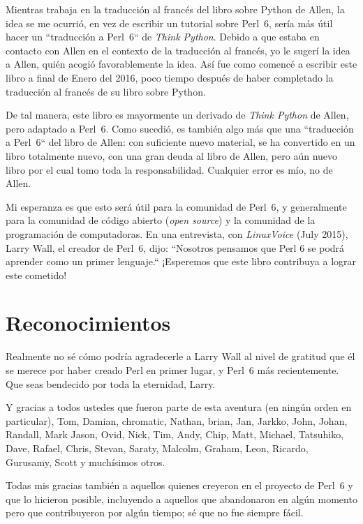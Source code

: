 Mientras trabaja en la traducción al francés del libro sobre Python
de Allen, la idea se me ocurrió, en vez de escribir un tutorial
sobre Perl~6, sería más útil hacer un ``traducción a Perl~6`` de 
\emph{Think Python}. Debido a que estaba en contacto con Allen en 
el contexto de la traducción al francés, yo le sugerí la idea a Allen, 
quién acogió favorablemente la idea. Así fue como comencé a escribir este 
libro a final de Enero del 2016, poco tiempo después de haber completado
la traducción al francés de su libro sobre Python.

De tal manera, este libro es mayormente un derivado de \emph{Think Python}
de Allen, pero adaptado a Perl~6. Como sucedió, es también algo más que 
una ``traducción a Perl~6`` del libro de Allen: con suficiente nuevo material,
se ha convertido en un libro totalmente nuevo, con una gran deuda al 
libro de Allen, pero aún nuevo libro por el cual tomo toda la responsabilidad.
Cualquier error es mío, no de Allen.

Mi esperanza es que esto será útil para la comunidad de Perl~6, y
generalmente para la comunidad de código abierto (\emph{open source})
y la comunidad de la programación de computadoras. En una entrevista,
con \emph{LinuxVoice} (July 2015), Larry Wall, el creador de Perl~6, dijo:
``Nosotros pensamos que Perl 6 se podrá aprender como un primer lenguaje.``
¡Esperemos que este libro contribuya a  lograr este cometido!


\section*{Reconocimientos}

Realmente no sé cómo podría agradecerle a Larry Wall al nivel de gratitud
que él se merece por haber creado Perl en primer lugar, y 
Perl~6 más recientemente. Que seas bendecido por toda la eternidad, Larry.

Y gracias a todos ustedes que fueron parte de esta aventura (en ningún orden en 
particular), Tom, Damian, 
chromatic, Nathan, brian, Jan, Jarkko, John, Johan, Randall, 
Mark Jason, Ovid, Nick, Tim, Andy, Chip, Matt, Michael, Tatsuhiko, 
Dave, Rafael, Chris, Stevan, Saraty, Malcolm, Graham, Leon, 
Ricardo, Gurusamy, Scott y muchísimos otros.

Todas mis gracias también a aquellos quienes creyeron
en el proyecto de Perl~6 y que lo hicieron posible, incluyendo
a aquellos que abandonaron en algún momento pero que contribuyeron
por algún tiempo; sé que no fue siempre fácil.

